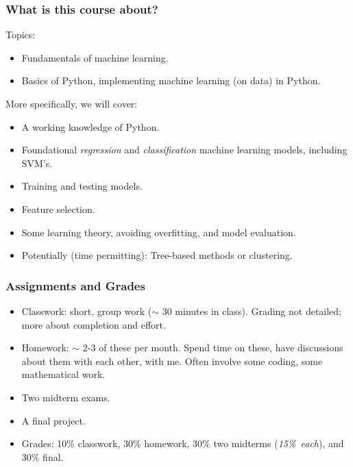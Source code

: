 \documentclass{beamer}
\theoremstyle{example}
\begin{document}
\begin{frame}
\frametitle{What is this course about?}
Topics:

\begin{itemize}
	\item[] Fundamentals of machine learning.
    \item[] Basics of Python, implementing machine learning (on data) in Python.
\end{itemize}

\pause
More specifically, we will cover:
\begin{itemize}
    \item A working knowledge of Python.
	\item Foundational \emph{regression} and \emph{classification} machine learning models, including SVM's.
    \pause
	\item Training and testing models.
    \pause
    \item Feature selection.
    \item Some learning theory, avoiding overfitting, and model evaluation.
    \pause
    \item Potentially (time permitting): Tree-based methods or clustering.
\end{itemize}

\end{frame}

\begin{frame}
\frametitle{Assignments and Grades}
    \begin{itemize}
        \item Classwork: short, group work ($\sim$ 30 minutes in class). Grading not detailed; more about completion and effort.
        \pause
        \item Homework: $\sim$ 2-3 of these per month. Spend time on these, have discussions about them with each other, with me. Often involve some coding, some mathematical work. 
        \pause
        \item Two midterm exams.
        \item A final project.

        \vfill
        \pause
        \item Grades: 10\% classwork, 30\% homework, 30\% two midterms \mbox{(\textit{15\% each}),} and 30\% final.
    \end{itemize}
    
\end{frame}
\end{document}
